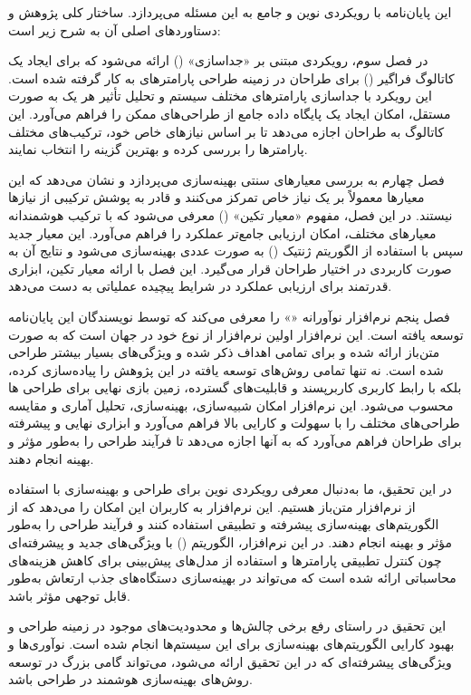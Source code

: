 این پایان‌نامه با رویکردی نوین و جامع به این مسئله می‌پردازد. ساختار کلی پژوهش و دستاوردهای اصلی آن به شرح زیر است:

در فصل سوم، رویکردی مبتنی بر «جداسازی» () ارائه می‌شود که برای ایجاد یک کاتالوگ فراگیر () برای طراحان در زمینه طراحی پارامترهای  به کار گرفته شده است. این رویکرد با جداسازی پارامترهای مختلف سیستم و تحلیل تأثیر هر یک به صورت مستقل، امکان ایجاد یک پایگاه داده جامع از طراحی‌های ممکن را فراهم می‌آورد. این کاتالوگ به طراحان اجازه می‌دهد تا بر اساس نیازهای خاص خود، ترکیب‌های مختلف پارامترها را بررسی کرده و بهترین گزینه را انتخاب نمایند.

فصل چهارم به بررسی معیارهای سنتی بهینه‌سازی می‌پردازد و نشان می‌دهد که این معیارها معمولاً بر یک نیاز خاص تمرکز می‌کنند و قادر به پوشش ترکیبی از نیازها نیستند. در این فصل، مفهوم «معیار تکین» () معرفی می‌شود که با ترکیب هوشمندانه معیارهای مختلف، امکان ارزیابی جامع‌تر عملکرد  را فراهم می‌آورد. این معیار جدید سپس با استفاده از الگوریتم ژنتیک () به صورت عددی بهینه‌سازی می‌شود و نتایج آن به صورت کاربردی در اختیار طراحان قرار می‌گیرد. این فصل با ارائه معیار تکین، ابزاری قدرتمند برای ارزیابی عملکرد  در شرایط پیچیده عملیاتی به دست می‌دهد.

فصل پنجم نرم‌افزار نوآورانه «» را معرفی می‌کند که توسط نویسندگان این پایان‌نامه توسعه یافته است. این نرم‌افزار اولین نرم‌افزار از نوع خود در جهان است که به صورت متن‌باز ارائه شده و برای تمامی اهداف ذکر شده و ویژگی‌های بسیار بیشتر طراحی شده است.  نه تنها تمامی روش‌های توسعه یافته در این پژوهش را پیاده‌سازی کرده، بلکه با رابط کاربری کاربرپسند و قابلیت‌های گسترده، زمین بازی نهایی برای طراحی ها محسوب می‌شود. این نرم‌افزار امکان شبیه‌سازی، بهینه‌سازی، تحلیل آماری و مقایسه طراحی‌های مختلف را با سهولت و کارایی بالا فراهم می‌آورد و ابزاری نهایی و پیشرفته برای طراحان فراهم می‌آورد که به آنها اجازه می‌دهد تا فرآیند طراحی  را به‌طور مؤثر و بهینه انجام دهند.

در این تحقیق، ما به‌دنبال معرفی رویکردی نوین برای طراحی و بهینه‌سازی  با استفاده از نرم‌افزار متن‌باز  هستیم. این نرم‌افزار به کاربران این امکان را می‌دهد که از الگوریتم‌های بهینه‌سازی پیشرفته و تطبیقی استفاده کنند و فرآیند طراحی  را به‌طور مؤثر و بهینه انجام دهند. در این نرم‌افزار، الگوریتم  () با ویژگی‌های جدید و پیشرفته‌ای چون کنترل تطبیقی پارامترها و استفاده از مدل‌های پیش‌بینی برای کاهش هزینه‌های محاسباتی ارائه شده است که می‌تواند در بهینه‌سازی دستگاه‌های جذب ارتعاش به‌طور قابل توجهی مؤثر باشد.

این تحقیق در راستای رفع برخی چالش‌ها و محدودیت‌های موجود در زمینه طراحی  و بهبود کارایی الگوریتم‌های بهینه‌سازی برای این سیستم‌ها انجام شده است. نوآوری‌ها و ویژگی‌های پیشرفته‌ای که در این تحقیق ارائه می‌شود، می‌تواند گامی بزرگ در توسعه روش‌های بهینه‌سازی هوشمند در طراحی  باشد.




